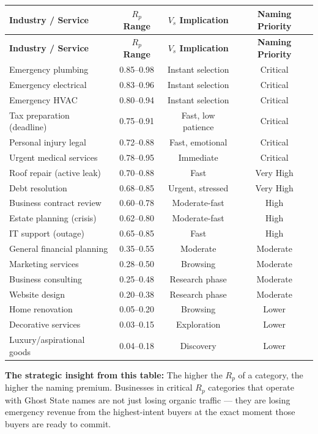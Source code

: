 \documentclass[12pt, openany]{book}
\theoremstyle{thmstyle}
\theoremstyle{defstyle}
\begin{document}
\begin{center}
\begin{longtable}{lccc}
\toprule
\textbf{Industry / Service} & \textbf{$R_p$ Range} & \textbf{$V_s$ Implication} & \textbf{Naming Priority} \\
\midrule
\endfirsthead
\toprule
\textbf{Industry / Service} & \textbf{$R_p$ Range} & \textbf{$V_s$ Implication} & \textbf{Naming Priority} \\
\midrule
\endhead
\bottomrule
\endlastfoot
Emergency plumbing & 0.85--0.98 & Instant selection & Critical \\
Emergency electrical & 0.83--0.96 & Instant selection & Critical \\
Emergency HVAC & 0.80--0.94 & Instant selection & Critical \\
Tax preparation (deadline) & 0.75--0.91 & Fast, low patience & Critical \\
Personal injury legal & 0.72--0.88 & Fast, emotional & Critical \\
Urgent medical services & 0.78--0.95 & Immediate & Critical \\
Roof repair (active leak) & 0.70--0.88 & Fast & Very High \\
Debt resolution & 0.68--0.85 & Urgent, stressed & Very High \\
Business contract review & 0.60--0.78 & Moderate-fast & High \\
Estate planning (crisis) & 0.62--0.80 & Moderate-fast & High \\
IT support (outage) & 0.65--0.85 & Fast & High \\
General financial planning & 0.35--0.55 & Moderate & Moderate \\
Marketing services & 0.28--0.50 & Browsing & Moderate \\
Business consulting & 0.25--0.48 & Research phase & Moderate \\
Website design & 0.20--0.38 & Research phase & Moderate \\
Home renovation & 0.05--0.20 & Browsing & Lower \\
Decorative services & 0.03--0.15 & Exploration & Lower \\
Luxury/aspirational goods & 0.04--0.18 & Discovery & Lower \\
\end{longtable}
\end{center}

\textbf{The strategic insight from this table:} The higher the $R_p$ of a category, the higher the naming premium. Businesses in critical $R_p$ categories that operate with Ghost State names are not just losing organic traffic --- they are losing emergency revenue from the highest-intent buyers at the exact moment those buyers are ready to commit.
\end{document}

